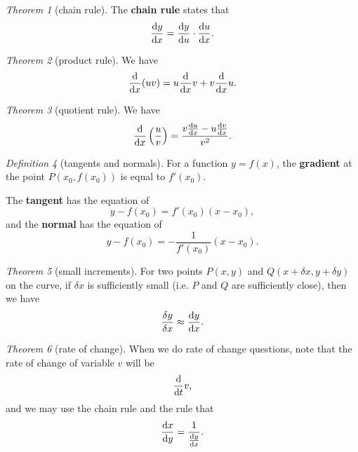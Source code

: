 \documentclass[8pt]{article}
\theoremstyle{remark}
\newtheorem{theorem}{Theorem}[section]
\newtheorem{definition}[theorem]{Definition}
\begin{document}
            \begin{theorem}[chain rule]
                The \textbf{chain rule} states that
                $$
                    \frac{\mathrm{d} y}{\mathrm{d} x} = \frac{\mathrm{d} y}{\mathrm{d} u} \cdot \frac{\mathrm{d} u}{\mathrm{d} x}.
                $$
            \end{theorem}

            \begin{theorem}[product rule]
                We have
                $$
                    \frac{\mathrm{d}}{\mathrm{d} x} (uv) = u \frac{\mathrm{d}}{\mathrm{d} x} v + v \frac{\mathrm{d}}{\mathrm{d} x} u.
                $$
            \end{theorem}

            \begin{theorem}[quotient rule]
                We have
                $$
                    \frac{\mathrm{d}}{\mathrm{d} x}\left(\frac{u}{v}\right) = \frac{v \frac{\mathrm{d} u}{\mathrm{d} x} - u \frac{\mathrm{d} v}{\mathrm{d} x}}{v^2}.
                $$
            \end{theorem}

            \begin{definition}[tangents and normals]
                For a function $y = f(x)$, the \textbf{gradient} at the point $P(x_0, f(x_0))$ is equal to $f'(x_0)$.

                The \textbf{tangent} has the equation of
                $$
                    y - f(x_0) = f'(x_0) (x - x_0),
                $$
                and the \textbf{normal} has the equation of
                $$
                    y - f(x_0) = - \frac{1}{f'(x_0)} (x - x_0).
                $$
            \end{definition}

            \begin{theorem}[small increments]
                For two points $P(x, y)$ and $Q(x + \delta x, y + \delta y)$ on the curve, if $\delta x$ is sufficiently small (i.e. $P$ and $Q$ are sufficiently close), then we have
                $$
                    \frac{\delta y}{\delta x} \approx \frac{\mathrm{d} y}{\mathrm{d} x}.
                $$
            \end{theorem}

            \begin{theorem}[rate of change]
                When we do rate of change questions, note that the rate of change of variable $v$ will be
                $$
                    \frac{\mathrm{d}}{\mathrm{d} t} v,
                $$
                and we may use the chain rule and the rule that
                $$
                    \frac{\mathrm{d} x}{\mathrm{d} y} = \frac{1}{\frac{\mathrm{d} y}{\mathrm{d} x}}.
                $$
            \end{theorem}
\end{document}
